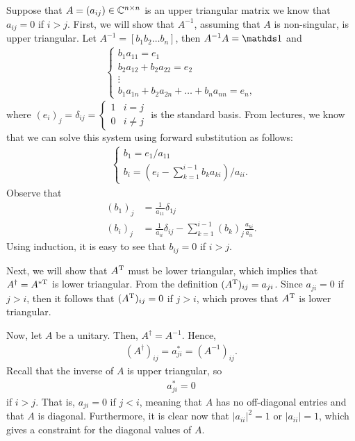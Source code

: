 Suppose that $A = (a_{ij}) \in \mathbb{C}^{n \times n}$ is an upper triangular matrix we know that $a_{ij} = 0$ if $i > j$.
First, we will show that $A^{-1}$, assuming that $A$ is non-singular, is upper triangular.
Let $A^{-1} = [b_1 b_2 \ldots b_{n}]$, then $A^{-1}A = \id$ and
\begin{eqnarray}
    \label{eq:inverse-equations}
    \begin{cases}
    b_1a_{11} = e_1 \\
    b_2a_{12} + b_2a_{22} = e_2 \\
    \vdots \\
    b_1a_{1n} + b_2a_{2n} + \ldots + b_{n}a_{nn} = e_{n}
    ,\end{cases} 
\end{eqnarray}
where $(e_{i})_{j} = \delta_{ij} = \begin{cases}
    1 & i = j \\
    0 & i \ne j
\end{cases}$
is the standard basis.
From lectures, we know that we can solve this system using forward substitution as follows:
\begin{eqnarray}
    \label{eq:backsub}
    \begin{cases}
    b_1 = e_1/a_{11} \\
    b_{i} = (e_{i} - \sum_{k=1}^{i-1} b_{k}a_{ki})/a_{ii}
    .\end{cases} 
\end{eqnarray}
Observe that
\begin{align}
    \label{eq:prove-upper-triangle}
    (b_1)_{j} &= \frac{1}{a_{11}}\delta_{1j} \\
    (b_{i})_{j} &= \frac{1}{a_{ii}}\delta_{ij} - \sum_{k=1}^{i-1} (b_{k})_{j}\frac{a_{ki}}{a_{ii}}
.\end{align}
Using induction, it is easy to see that $b_{ij} = 0$ if $i > j$.

Next, we will show that $A^{\rm T}$ must be lower triangular, which implies that $A^{\dagger} = A^{* {\rm T}}$ is lower triangular.
From the definition $(A^{\rm T})_{ij} = a_{ji}$.
Since $a_{ji} = 0$ if $j > i$, then it follows that $(A^{\rm T})_{ij} = 0$ if $j > i$, which proves that $A^{\rm T}$ is lower triangular.

Now, let $A$ be a unitary.
Then, $A^{\dagger} = A^{-1}$.
Hence,
\begin{eqnarray}
    \label{eq:Adag-Ainv}
    (A^{\dagger})_{ij} = a^{*}_{ji} = (A^{-1})_{ij}
.\end{eqnarray}
Recall that the inverse of $A$ is upper triangular, so
\begin{eqnarray}
    \label{eq:prove-diagonal}
    a^{*}_{ji} = 0
\end{eqnarray}
if $i > j$.
That is, $a_{ji} = 0$ if $j < i$, meaning that $A$ has no off-diagonal entries and that $A$ is diagonal.
Furthermore, it is clear now that $|a_{ii}|^{2} = 1$ or $|a_{ii}| = 1$, which gives a constraint for the diagonal values of $A$.

